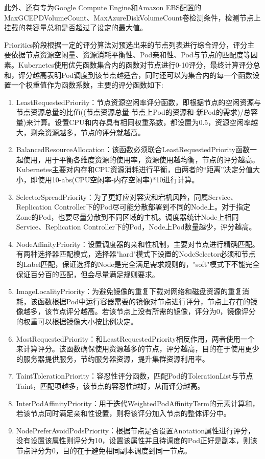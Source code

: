 此外、还有专为Google Compute Engine和Amazon EBS配置的MaxGCEPDVolumeCount、MaxAzureDiskVolumeCount卷检测条件，检测节点上挂载的卷容量总和是否超过了设定的最大值。

Priorities阶段根据一定的评分算法对预选出来的节点列表进行综合评分，评分主要依据节点资源空闲量、资源消耗平衡性、Pod亲和性、Pod与节点的匹配度等因素。Kubernetes使用优先函数集合内的函数对节点进行0-10评分，最终计算评分总和，评分越高表明Pod调度到该节点越适合，同时还可以为集合内的每一个函数设置一个权重值作为函数系数，主要的评分函数如下:
\begin{enumerate}[(1)]
	\item LeastRequestedPriority：节点资源空闲率评分函数，即根据节点的空闲资源与节点资源总量的比值((节点资源总量-节点上Pod的资源和-新Pod的需求)/总容量)来计算。设置CPU和内存具有相同权重系数，都设置为0.5，资源空闲率越大，剩余资源越多，节点的评分就越高。
	\item BalancedResourceAllocation：该函数必须联合LeastRequestedPriority函数一起使用，用于平衡各维度资源的使用率，资源使用越均衡，节点的评分越高。Kubernetes主要对内存和CPU资源消耗进行平衡，由两者的“距离”决定分值大小，即使用10-abs(CPU空闲率-内存空闲率)*10进行计算。
	\item SelectorSpreadPriority：为了更好应对容灾和宕机风险，同属Service、Replication Controller下的Pod尽可能分散部署到不同的Node上。对于指定Zone的Pod，也要尽量分散到不同区域的主机。调度器统计Node上相同Service、Replication Controller下的Pod，Node上Pod数量越少，评分越高。
	\item NodeAffinityPriority：设置调度器的亲和性机制，主要对节点进行精确匹配。有两种选择器匹配模式，选择器"hard"模式下设置的NodeSelector必须和节点的Label匹配，保证选择的Node是完全满足需求规则的，"soft"模式下不能完全保证百分百的匹配，但会尽量满足规则要求。
	\item ImageLocalityPriority：为避免镜像的重复下载对网络和磁盘资源的重复消耗，该函数根据Pod中运行容器需要的镜像对节点进行评分，节点上存在的镜像越多，该节点评分越高。若该节点上没有所需的镜像，评分为0，镜像评分的权重可以根据镜像大小按比例决定。
	\item MostRequestedPriority：和LeastRequestedPriority相反作用，两者使用一个来计算评分。该函数确保使用资源越多的节点，评分越高，目的在于使用更少的服务器提供服务，节约服务器资源，提升集群资源利用率。
	\item TaintTolerationPriority：容忍性评分函数，匹配Pod的TolerationList与节点Taint，匹配项越多，该节点的容忍性越好，从而评分越高。
	\item InterPodAffinityPriority：用于迭代WeightedPodAffinityTerm的元素计算和，若该节点同时满足亲和性设置，则将该评分加入节点的整体评分中。
	\item NodePreferAvoidPodsPriority：根据节点是否设置Anotation属性进行评分，没有设置该属性则评分为10，设置该属性并且待调度的Pod正好是副本，则该节点评分为0，目的在于避免相同副本调度到同一节点。
\end{enumerate}

